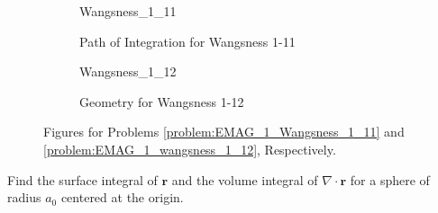 \documentclass[crop=false,class=article,oneside]{standalone}
\begin{document}
        \begin{figure}[H]
            \centering
            \captionsetup{type=figure}
            \begin{subfigure}[b]{0.49\textwidth}
                \centering
                \captionsetup{type=figure}
                {Wangsness_1_11}
                \caption{Path of Integration for Wangsness 1-11}
                \label{%
                    fig:EMAG_1_path_of_integration_%
                    for_wangsness_1_11%
                }
            \end{subfigure}
            \begin{subfigure}[b]{0.49\textwidth}
                \centering
                \captionsetup{type=figure}
                {Wangsness_1_12}
                \caption{Geometry for Wangsness 1-12}
                \label{fig:EMAG_1_geometry_for_wangsness_1_12}
            \end{subfigure}
            \caption[Figures for Wangsness 1-11 and 1-12]{%
                Figures for Problems
                \ref{problem:EMAG_1_Wangsness_1_11} and
                \ref{problem:EMAG_1_wangsness_1_12}, Respectively.
            }
            \label{fig:EMAG_1_figures_for_wangsness_1_11_and_1_12}
        \end{figure}
        \begin{problem}[Wangsness 1-12]
            \label{problem:EMAG_1_wangsness_1_12}
            Find the surface integral of $\mathbf{r}$ and the
            volume integral of $\nabla\cdot\mathbf{r}$
            for a sphere of radius $a_{0}$
            centered at the origin.
        \end{problem}
\end{document}
